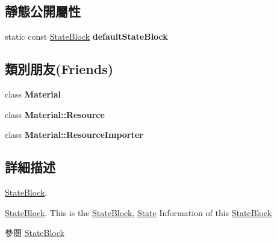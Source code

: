 \subsection*{靜態公開屬性}
\begin{DoxyCompactItemize}
\item 
static const \hyperlink{class_i_dream_sky_1_1_material_1_1_state_block}{State\+Block} {\bfseries default\+State\+Block}\hypertarget{class_i_dream_sky_1_1_material_1_1_state_block_aba42323670b5b3bb2b09e033d1173da5}{}\label{class_i_dream_sky_1_1_material_1_1_state_block_aba42323670b5b3bb2b09e033d1173da5}

\end{DoxyCompactItemize}
\subsection*{類別朋友(Friends)}
\begin{DoxyCompactItemize}
\item 
class {\bfseries Material}\hypertarget{class_i_dream_sky_1_1_material_1_1_state_block_aa1212b6e372a0f45d2c01f3cd203af77}{}\label{class_i_dream_sky_1_1_material_1_1_state_block_aa1212b6e372a0f45d2c01f3cd203af77}

\item 
class {\bfseries Material\+::\+Resource}\hypertarget{class_i_dream_sky_1_1_material_1_1_state_block_a6a002bcee6c883089769545352e9ccbd}{}\label{class_i_dream_sky_1_1_material_1_1_state_block_a6a002bcee6c883089769545352e9ccbd}

\item 
class {\bfseries Material\+::\+Resource\+Importer}\hypertarget{class_i_dream_sky_1_1_material_1_1_state_block_a941a71e735085112a8496c27836506ee}{}\label{class_i_dream_sky_1_1_material_1_1_state_block_a941a71e735085112a8496c27836506ee}

\end{DoxyCompactItemize}


\subsection{詳細描述}
\hyperlink{class_i_dream_sky_1_1_material_1_1_state_block}{State\+Block}. 

\hyperlink{class_i_dream_sky_1_1_material_1_1_state_block}{State\+Block}. This is the \hyperlink{class_i_dream_sky_1_1_material_1_1_state_block}{State\+Block}, \hyperlink{class_i_dream_sky_1_1_state}{State} Information of this \hyperlink{class_i_dream_sky_1_1_material_1_1_state_block}{State\+Block} \begin{DoxySeeAlso}{參閱}
\hyperlink{class_i_dream_sky_1_1_material_1_1_state_block}{State\+Block} 
\end{DoxySeeAlso}


